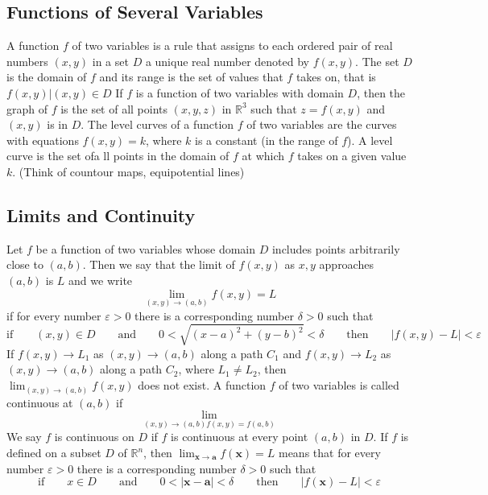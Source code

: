 \documentclass{article}
\begin{document}
    \subsection{Functions of Several Variables} %
    \begin{outline}
        \1 A function $f$ of two variables is a rule that assigns to each ordered pair of real numbers \((x,y)\) in a set $D$ a unique real number denoted by \(f(x,y)\). The set $D$ is the domain of $f$ and its range is the set of values that $f$ takes on, that is \({f(x,y)|(x,y)\in D}\)
        \1 If $f$ is a function of two variables with domain $D$, then the graph of $f$ is the set of all points \((x,y,z)\) in \(\mathbb{R}^3\) such that \(z=f(x,y)\) and \((x,y)\) is in $D$. 
        \1 The level curves of a function $f$ of two variables are the curves with equations \(f(x,y)=k\), where $k$ is a constant (in the range of $f$). 
            \2 A level curve is the set ofa ll points in the domain of $f$ at which $f$ takes on a given value $k$. (Think of countour maps, equipotential lines)


    \end{outline}
    \subsection{Limits and Continuity}
    \begin{outline}
        \1 Let $f$ be a function of two variables whose domain $D$ includes points arbitrarily close to \((a,b)\). Then we say that the limit of \(f(x,y)\) as \(x,y\) approaches \((a,b)\) is $L$ and we write \[\lim_{(x,y)\to(a,b)}f(x,y)=L\] if for every number \(\varepsilon>0\) there is a corresponding number \(\delta>0\) such that \[\text{if}\qquad(x,y)\in D\qquad\text{and}\qquad 0<\sqrt{(x-a)^2+(y-b)^2}<\delta\qquad\text{then}\qquad|f(x,y)-L|<\varepsilon\]
        \1 If \(f(x,y)\to L_1\) as \((x,y)\to(a,b)\) along a path $C_1$ and \(f(x,y)\to L_2\) as \((x,y)\to(a,b)\) along a path $C_2$, where \(L_1\neq L_2\), then \(\lim_{(x,y)\to(a,b)}f(x,y)\) does not exist. 
        \1 A function $f$ of two variables is called continuous at \((a,b)\) if \[\lim_{(x,y)\to(a,b)f(x,y)=f(a,b)}\] We say $f$ is continuous on $D$ if $f$ is continuous at every point \((a,b)\) in $D$. 
        \1 If $f$ is defined on a subset $D$ of \(\mathbb{R}^n\), then \(\lim_{\mathbf x\to\mathbf a}f(\mathbf x)=L\) means that for every number \(\varepsilon>0\) there is a corresponding number \(\delta>0\) such that \[\text{if}\qquad x\in D\qquad\text{and}\qquad 0<|\mathbf x-\mathbf a|<\delta \qquad\text{then}\qquad |f(\mathbf x)-L|<\varepsilon\]
    \end{outline}
\end{document}
